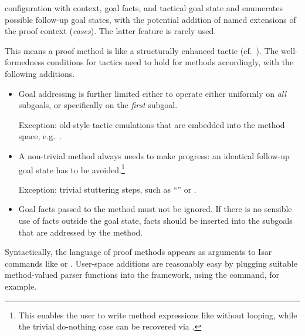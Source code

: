 \begin{isabellebody}
\begin{isamarkuptext}
  configuration with context, goal facts, and tactical goal state and
  enumerates possible follow-up goal states, with the potential
  addition of named extensions of the proof context (\emph{cases}).
  The latter feature is rarely used.

  This means a proof method is like a structurally enhanced tactic
  (cf.\ ).  The well-formedness conditions for
  tactics need to hold for methods accordingly, with the following
  additions.

  \begin{itemize}

  \item Goal addressing is further limited either to operate either
  uniformly on \emph{all} subgoals, or specifically on the
  \emph{first} subgoal.

  Exception: old-style tactic emulations that are embedded into the
  method space, e.g.\ \hyperlink{method.rule-tac}{\mbox{}}.

  \item A non-trivial method always needs to make progress: an
  identical follow-up goal state has to be avoided.\footnote{This
  enables the user to write method expressions like 
  without looping, while the trivial do-nothing case can be recovered
  via .}

  Exception: trivial stuttering steps, such as ``\hyperlink{method.-}{\mbox{}}'' or
  \hyperlink{method.succeed}{\mbox{}}.

  \item Goal facts passed to the method must not be ignored.  If there
  is no sensible use of facts outside the goal state, facts should be
  inserted into the subgoals that are addressed by the method.

  \end{itemize}

  \medskip Syntactically, the language of proof methods appears as
  arguments to Isar commands like \hyperlink{command.by}{\mbox{}} or \hyperlink{command.apply}{\mbox{}}.
  User-space additions are reasonably easy by plugging suitable
  method-valued parser functions into the framework, using the
  \hyperlink{command.method-setup}{\mbox{}} command, for example.


\end{isamarkuptext}
\end{isabellebody}
